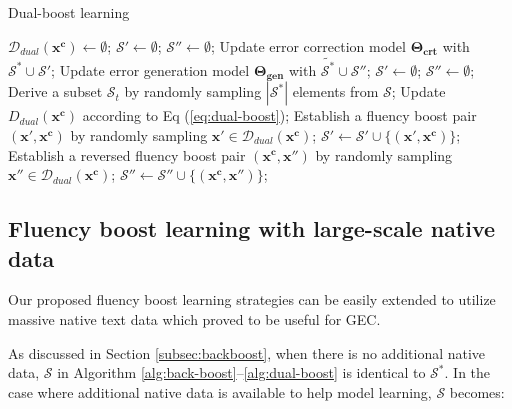 \documentclass{article} %
\begin{document}
\begin{algorithm}[t]
\centering
\caption{Dual-boost learning\label{alg:dual-boost}}
\begin{algorithmic}[1]
\State $\mathcal{D}_{dual}(\boldsymbol{x^c}) \gets \emptyset$;
\EndFor
\State $\mathcal{S'} \gets \emptyset$; $\mathcal{S''} \gets \emptyset$; 
\State Update error correction model $\boldsymbol{\Theta_{crt}}$ with $\mathcal{S}^* \cup \mathcal{S'}$;
\State Update error generation model $\boldsymbol{\Theta_{gen}}$ with $\widetilde{\mathcal{S}^*} \cup \mathcal{S''}$;
\State $\mathcal{S'} \gets \emptyset$; $\mathcal{S''} \gets \emptyset$; 
\State Derive a subset $\mathcal{S}_t$ by randomly sampling $|\mathcal{S}^*|$ elements from $\mathcal{S}$; 
\State Update $D_{dual}(\boldsymbol{x^c})$ according to Eq (\ref{eq:dual-boost});
\State Establish a fluency boost pair $(\boldsymbol{x'},\boldsymbol{x^c})$ by randomly sampling $\boldsymbol{x'} \in \mathcal{D}_{dual}(\boldsymbol{x^c})$;
\State $\mathcal{S'} \gets \mathcal{S'} \cup \{(\boldsymbol{x'},\boldsymbol{x^c})\}$;
\State Establish a reversed fluency boost pair $(\boldsymbol{x^c},\boldsymbol{x''})$ by randomly sampling $\boldsymbol{x''} \in \mathcal{D}_{dual}(\boldsymbol{x^c})$;
\State $\mathcal{S''} \gets \mathcal{S''} \cup \{(\boldsymbol{x^c},\boldsymbol{x''})\}$;
\EndFor
\EndFor
\end{algorithmic}
\end{algorithm}

\subsection{Fluency boost learning with large-scale native data}\label{subsec:native}


Our proposed fluency boost learning strategies can be easily extended to utilize massive native text data which proved to be useful for GEC.

As discussed in Section \ref{subsec:backboost}, when there is no additional native data, $\mathcal{S}$ in Algorithm \ref{alg:back-boost}--\ref{alg:dual-boost} is identical to $\mathcal{S}^*$. In the case where additional native data is available to help model learning, $\mathcal{S}$ becomes:
\end{document}
